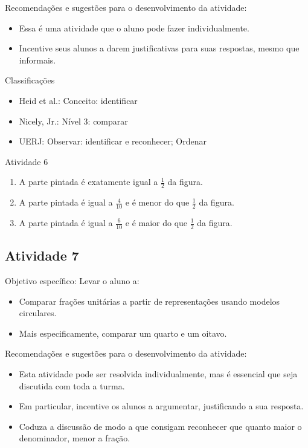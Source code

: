 \documentclass[oneside]{book}
\begin{document}
\begin{multicols}{2}
  Recomendações e sugestões para o desenvolvimento da atividade:
\begin{itemize} %
    \item       Essa é uma atividade que o aluno pode fazer individualmente.
    \item       Incentive seus alunos a darem justificativas para suas respostas, mesmo que informais.
\end{itemize} %


  Classificações
\begin{itemize} %
    \item       Heid et al.: Conceito: identificar
    \item       Nicely, Jr.: Nível 3: comparar
    \item       UERJ: Observar: identificar e reconhecer; Ordenar
\end{itemize} %



\begin{resposta*}{Atividade 6}
\begin{enumerate} [\quad a)] %
    \item       A parte pintada é exatamente igual a       $\frac{1}{2}$       da figura.
    \item       A parte pintada é igual a       $\frac{4}{10}$       e é menor do que       $\frac{1}{2}$       da figura.
    \item       A parte pintada é igual a       $\frac{6}{10}$       e é maior do que       $\frac{1}{2}$       da figura.
\end{enumerate} %

\end{resposta*}




\subsection{Atividade 7}



  Objetivo específico: Levar o aluno a:
\begin{itemize} %
    \item       Comparar frações unitárias a partir de representações usando modelos circulares.
    \item       Mais especificamente, comparar um quarto e um oitavo.
\end{itemize} %


  Recomendações e sugestões para o desenvolvimento da atividade:
\begin{itemize} %
    \item       Esta atividade pode ser resolvida individualmente, mas é essencial que seja discutida com toda a turma.
    \item       Em particular, incentive os alunos a argumentar, justificando a sua resposta.
    \item       Coduza a discussão de modo a que consigam reconhecer que quanto maior o denominador, menor a fração.
\end{itemize} %



\end{multicols}
\end{document}
